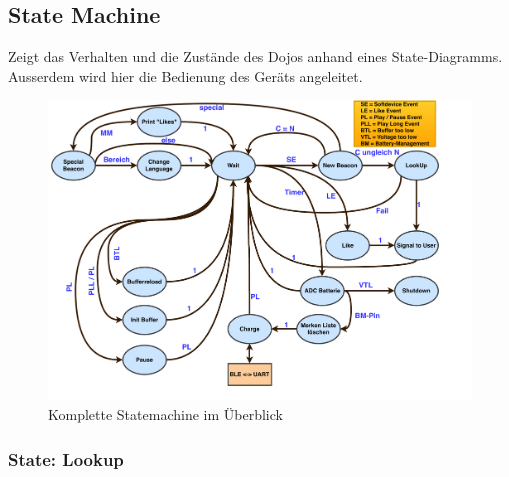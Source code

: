 \subsection{State Machine}\label{sec:stateMachine}

Zeigt das Verhalten und die Zustände des Dojos anhand eines State-Diagramms. Ausserdem wird hier die Bedienung des Geräts angeleitet.

\begin{figure}[htbp]
	\centering
	\includegraphics[width=1.1 \textwidth]{Data/Statemachine.pdf}
	\caption[Statemachine-Diagramm]{Komplette Statemachine im Überblick}
	\label{fig:completeStateMachine}
\end{figure} 

\subsubsection*{State: Lookup}


